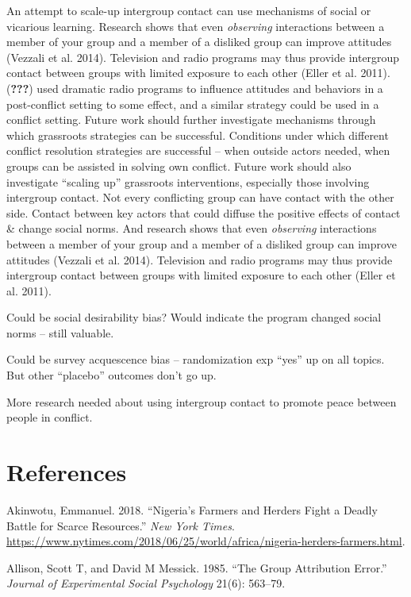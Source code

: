 \documentclass[11pt]{article}
\begin{document}
An attempt to scale-up intergroup contact can use mechanisms of social
or vicarious learning. Research shows that even \emph{observing}
interactions between a member of your group and a member of a disliked
group can improve attitudes (Vezzali et al. 2014). Television and radio
programs may thus provide intergroup contact between groups with limited
exposure to each other (Eller et al. 2011). ({\textbf{???}}) used
dramatic radio programs to influence attitudes and behaviors in a
post-conflict setting to some effect, and a similar strategy could be
used in a conflict setting. Future work should further investigate
mechanisms through which grassroots strategies can be successful.
Conditions under which different conflict resolution strategies are
successful -- when outside actors needed, when groups can be assisted in
solving own conflict. Future work should also investigate ``scaling up''
grassroots interventions, especially those involving intergroup contact.
Not every conflicting group can have contact with the other side.
Contact between key actors that could diffuse the positive effects of
contact \& change social norms. And research shows that even
\emph{observing} interactions between a member of your group and a
member of a disliked group can improve attitudes (Vezzali et al. 2014).
Television and radio programs may thus provide intergroup contact
between groups with limited exposure to each other (Eller et al. 2011).

Could be social desirability bias? Would indicate the program changed
social norms -- still valuable.

Could be survey acquescence bias -- randomization exp ``yes'' up on all
topics. But other ``placebo'' outcomes don't go up.

More research needed about using intergroup contact to promote peace
between people in conflict.

\hypertarget{references}{%
\section*{References}\label{references}}

\hypertarget{refs}{}
\leavevmode\hypertarget{ref-nyt2018nigeria}{}%
Akinwotu, Emmanuel. 2018. ``Nigeria's Farmers and Herders Fight a Deadly
Battle for Scarce Resources.'' \emph{New York Times}.
\url{https://www.nytimes.com/2018/06/25/world/africa/nigeria-herders-farmers.html}.

\leavevmode\hypertarget{ref-allison1985group}{}%
Allison, Scott T, and David M Messick. 1985. ``The Group Attribution
Error.'' \emph{Journal of Experimental Social Psychology} 21(6):
563--79.
\end{document}
